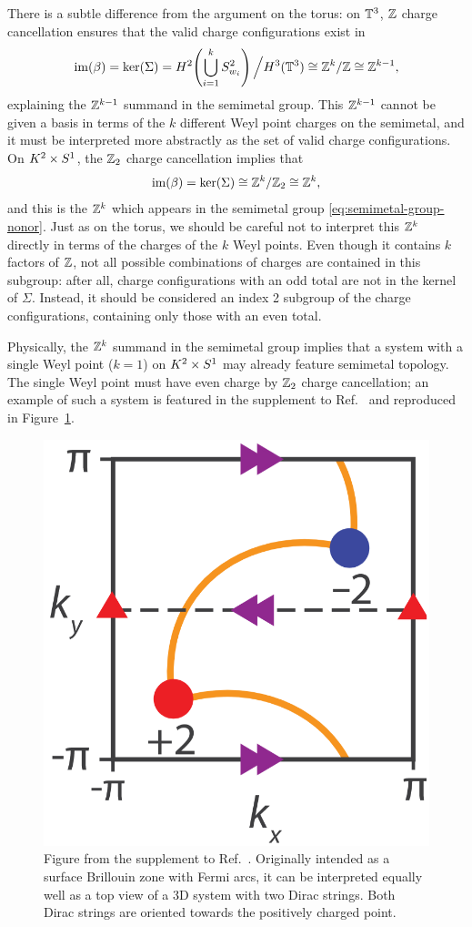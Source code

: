 There is a subtle difference from the argument on the torus: on $\mathbb{T}^3$, $\mathbb{Z}$ charge cancellation ensures that the valid charge configurations exist in 
\begin{equation*}
	\operatorname{im}(\beta) = \ker(\Sigma) = H^2\!\left(\bigcup_{i=1}^k S_{w_i}^2\right)\Big/H^3(\mathbb{T}^3) \cong \mathbb{Z}^k/\mathbb{Z} \cong \mathbb{Z}^{k-1},
\end{equation*}
explaining the $\mathbb{Z}^{k-1}$ summand in the semimetal group. This $\mathbb{Z}^{k-1}$ cannot be given a basis in terms of the $k$ different Weyl point charges on the semimetal, and it must be interpreted more abstractly as the set of valid charge configurations. On $K^2\times S^1$, the $\mathbb{Z}_2$ charge cancellation implies that
\begin{equation*}
	\operatorname{im}(\beta)=\ker(\Sigma)\cong\mathbb{Z}^k/\mathbb{Z}_2\cong\mathbb{Z}^k,
\end{equation*}
and this is the $\mathbb{Z}^k$ which appears in the semimetal group \eqref{eq:semimetal-group-nonor}. Just as on the torus, we should be careful not to interpret this $\mathbb{Z}^k$ directly in terms of the charges of the $k$ Weyl points. Even though it contains $k$ factors of $\mathbb{Z}$, not all possible combinations of charges are contained in this subgroup: after all, charge configurations with an odd total are not in the kernel of $\Sigma$. Instead, it should be considered an index 2 subgroup of the charge configurations, containing only those with an even total.

Physically, the $\mathbb{Z}^k$ summand in the semimetal group implies that a system with a single Weyl point ($k=1$) on $K^2\times S^1$ may already feature semimetal topology. The single Weyl point must have even charge by $\mathbb{Z}_2$ charge cancellation; an example of such a system is featured in the supplement to Ref.~\cite{Fonseca-Vaidya_nonorientable} and reproduced in Figure~\ref{fig:double-points}.
\begin{figure}[htb!]
	\centering
	\includegraphics[width=.4\linewidth]{Images/double-points}
	\caption{Figure from the supplement to Ref.~\cite{Fonseca-Vaidya_nonorientable}. Originally intended as a surface Brillouin zone with Fermi arcs, it can be interpreted equally well as a top view of a 3D system with two Dirac strings. Both Dirac strings are oriented towards the positively charged point.}
	\label{fig:double-points}
\end{figure}

